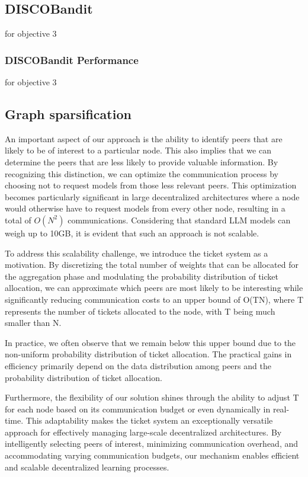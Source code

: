 \documentclass{article}
\begin{document}
        \subsection{DISCOBandit} for objective 3 
        \label{sec:results2}
        \subsubsection{DISCOBandit Performance} for objective 3
        

        \subsection{Graph sparsification}
        An important aspect of our approach is the ability to identify peers that are likely to be of interest to a particular node. This also implies that we can determine the peers that are less likely to provide valuable information. By recognizing this distinction, we can optimize the communication process by choosing not to request models from those less relevant peers. This optimization becomes particularly significant in large decentralized architectures where a node would otherwise have to request models from every other node, resulting in a total of $O(N^2)$ communications. Considering that standard LLM models can weigh up to 10GB, it is evident that such an approach is not scalable.

        To address this scalability challenge, we introduce the ticket system as a motivation. By discretizing the total number of weights that can be allocated for the aggregation phase and modulating the probability distribution of ticket allocation, we can approximate which peers are most likely to be interesting while significantly reducing communication costs to an upper bound of O(TN), where T represents the number of tickets allocated to the node, with T being much smaller than N.
        
        In practice, we often observe that we remain below this upper bound due to the non-uniform probability distribution of ticket allocation. The practical gains in efficiency primarily depend on the data distribution among peers and the probability distribution of ticket allocation.
        
        Furthermore, the flexibility of our solution shines through the ability to adjust T for each node based on its communication budget or even dynamically in real-time. This adaptability makes the ticket system an exceptionally versatile approach for effectively managing large-scale decentralized architectures. By intelligently selecting peers of interest, minimizing communication overhead, and accommodating varying communication budgets, our mechanism enables efficient and scalable decentralized learning processes.
        \label{sec:results3}
\end{document}
